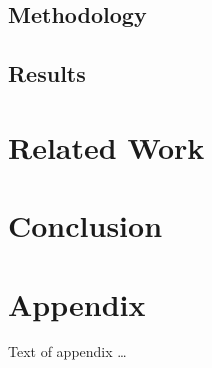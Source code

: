 \documentclass[sigplan,review,anonymous]{acmart}\settopmatter{printfolios=true,printccs=false,printacmref=false}
\begin{document}
\subsection{Methodology}

\subsection{Results}

\section{Related Work}

\section{Conclusion}

\appendix
\section{Appendix}

Text of appendix \ldots
\end{document}
